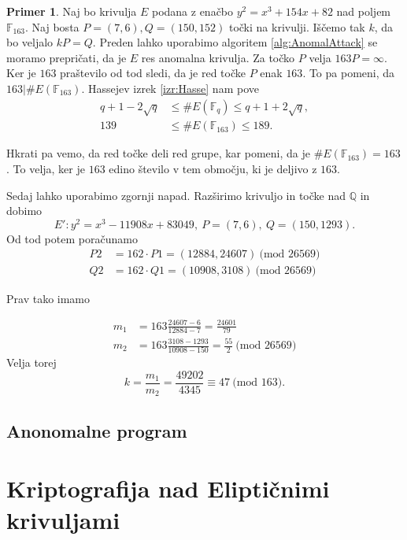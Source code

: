\documentclass[12pt,a4paper,twoside]{article}
\theoremstyle{definition} %
\newtheorem{primer}[definicija]{Primer}
\theoremstyle{plain} %
\numberwithin{equation}{section}  %
\newcommand{\Q}{\mathbb Q}
\newcommand{\F}{\mathbb F}
\newcommand{\E}[1]{E({#1})}
\newcommand{\MOD}[1]{\ \text{(mod }{#1}\text{)}}
\begin{document}
\begin{primer}
Naj bo krivulja $E$ podana z enačbo $y^2=x^3+154x+82$ nad poljem $\F_{163}$. Naj bosta $P = (7,6),Q = (150,152)$ točki na krivulji. Iščemo tak $k$, da bo veljalo $kP=Q$. Preden lahko uporabimo algoritem \ref{alg:AnomalAttack} se moramo prepričati, da je $E$ res anomalna krivulja. Za točko $P$ velja $163P = \infty$. Ker je $163$ praštevilo od tod sledi, da je red točke $P$ enak $163$. To pa pomeni, da $163|\#\E{\F_{163}}$. Hassejev izrek \ref{izr:Hasse} nam pove 
\begin{align}
q+1-2\sqrt{q} &{}\leq \#\E{\F_q} \leq q+1+2\sqrt{q}, \nonumber \\
139 &{}\leq \#\E{\F_{163}} \leq 189. \nonumber
\end{align}

Hkrati pa vemo, da red točke deli red grupe, kar pomeni, da je $\#\E{\F_{163}} = 163$. To velja, ker je $163$ edino število v tem območju, ki je deljivo z $163$.

Sedaj lahko uporabimo zgornji napad. Razširimo krivuljo in točke nad $\Q$ in dobimo
$$E': y^2 = x^3-11908x+83049, \ P =(7,6), \ Q=(150,1293).$$
Od tod potem poračunamo
\begin{align}
P2 &{}= 162\cdot P1 = (12884,24607) \MOD{26569} \nonumber \\
Q2 &{}= 162\cdot Q1 = (10908,3108) \MOD{26569} \nonumber
\end{align}

Prav tako imamo

\begin{align}
m_1 &{}= 163\frac{24607-6}{12884-7} = \frac{24601}{79} \nonumber \\
m_2 &{}= 163\frac{3108-1293}{10908-150} = \frac{55}{2} \MOD{26569} \nonumber
\end{align}
 Velja torej
$$k = \frac{m_1}{m_2} = \frac{49202}{4345} \equiv 47 \MOD{163}.$$
\end{primer}

\subsection{Anonomalne program}



\newpage

\section{Kriptografija nad Eliptičnimi krivuljami}
\end{document}
